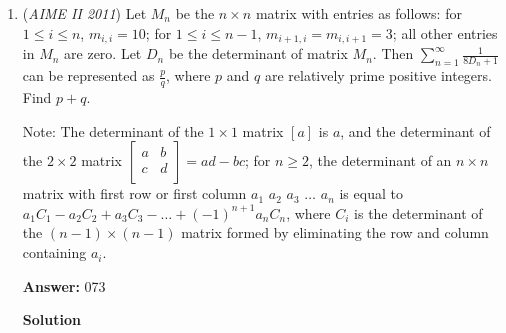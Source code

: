 \begin{enumerate}
 Thus the midpoint of $\overline{CD}$ is $N = \left(-\frac{104}{5}, \frac{16\sqrt{14}}{5}\right)$.

 The slope of $\overline{CD}$ is perpendicular to the radius at its midpoint: $\text{slope} = \frac{-(-104/5)}{16\sqrt{14}/5} = \frac{104/5}{16\sqrt{14}/5} = \frac{13}{2\sqrt{14}}$.

 Equation of the line through $N$:$y - \frac{16\sqrt{14}}{5} = \frac{13}{2\sqrt{14}} \left(x + \frac{104}{5}\right)$.

 Intersecting with $x=-20$ (the vertical line for AB): $y - \frac{16\sqrt{14}}{5} = \frac{13}{2\sqrt{14}} \cdot \frac{4}{5} \Rightarrow y = \frac{16\sqrt{14}}{5} + \frac{26}{5\sqrt{14}} = \frac{50}{\sqrt{14}}$.

 So the intersection point $P$ is $P = \left(-20, \frac{50}{\sqrt{14}}\right)$, and $OP^2 = (-20)^2 + \left(\frac{50}{\sqrt{14}}\right)^2 = 400 + \frac{2500}{14} = \frac{4050}{7}$.

 Thus $m+n = 4050 + 7 = 4057$, and the remainder when divided by $1000$ is $\boxed{57}.$



	\item (\textit{AIME II 2011}) Let $M_n$ be the $n \times n$ matrix with entries as follows: for $1 \le i \le n$, $m_{i,i} = 10$; for $1 \le i \le n - 1$, $m_{i+1,i} = m_{i,i+1} = 3$; all other entries in $M_n$ are zero. Let $D_n$ be the determinant of matrix $M_n$. Then $\sum_{n=1}^{\infty} \frac{1}{8D_n+1}$ can be represented as $\frac{p}{q}$, where $p$ and $q$ are relatively prime positive integers. Find $p + q$. 


 Note: The determinant of the $1 \times 1$ matrix $[a]$ is $a$, and the determinant of the $2 \times 2$ matrix $\left[ {\begin{array}{cc}  a & b  \\  c & d  \\  \end{array} } \right] = ad - bc$; for $n \ge 2$, the determinant of an $n \times n$ matrix with first row or first column $a_1$ $a_2$ $a_3$ $\dots$ $a_n$ is equal to $a_1C_1 - a_2C_2 + a_3C_3 - \dots + (-1)^{n+1}a_nC_n$, where $C_i$ is the determinant of the $(n - 1) \times (n - 1)$ matrix formed by eliminating the row and column containing $a_i$.


 
 \textbf{Answer: }073



\textbf{Solution}



\end{enumerate}
